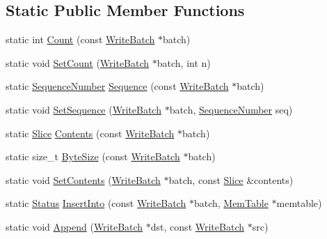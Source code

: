 \subsection*{Static Public Member Functions}
\begin{DoxyCompactItemize}
\item 
static int \mbox{\hyperlink{classleveldb_1_1_write_batch_internal_a5270ca4567dbae1524005ad14e0698e3}{Count}} (const \mbox{\hyperlink{classleveldb_1_1_write_batch}{Write\+Batch}} $\ast$batch)
\item 
static void \mbox{\hyperlink{classleveldb_1_1_write_batch_internal_ae03d20619da53aae175dd28d61c90bd9}{Set\+Count}} (\mbox{\hyperlink{classleveldb_1_1_write_batch}{Write\+Batch}} $\ast$batch, int n)
\item 
static \mbox{\hyperlink{namespaceleveldb_a5481ededd221c36d652c371249f869fa}{Sequence\+Number}} \mbox{\hyperlink{classleveldb_1_1_write_batch_internal_af657c82bd9378b78c35a3a7429f945d4}{Sequence}} (const \mbox{\hyperlink{classleveldb_1_1_write_batch}{Write\+Batch}} $\ast$batch)
\item 
static void \mbox{\hyperlink{classleveldb_1_1_write_batch_internal_a0ca3483de37433fb0ce37b1e91f01bd1}{Set\+Sequence}} (\mbox{\hyperlink{classleveldb_1_1_write_batch}{Write\+Batch}} $\ast$batch, \mbox{\hyperlink{namespaceleveldb_a5481ededd221c36d652c371249f869fa}{Sequence\+Number}} seq)
\item 
static \mbox{\hyperlink{classleveldb_1_1_slice}{Slice}} \mbox{\hyperlink{classleveldb_1_1_write_batch_internal_a348947b16653c8a17590b13115b5274d}{Contents}} (const \mbox{\hyperlink{classleveldb_1_1_write_batch}{Write\+Batch}} $\ast$batch)
\item 
static size\+\_\+t \mbox{\hyperlink{classleveldb_1_1_write_batch_internal_adad424f13cc3e3ed4a2eacb88eaa39df}{Byte\+Size}} (const \mbox{\hyperlink{classleveldb_1_1_write_batch}{Write\+Batch}} $\ast$batch)
\item 
static void \mbox{\hyperlink{classleveldb_1_1_write_batch_internal_aa07e75250aed00d06f2e4df85ee926b9}{Set\+Contents}} (\mbox{\hyperlink{classleveldb_1_1_write_batch}{Write\+Batch}} $\ast$batch, const \mbox{\hyperlink{classleveldb_1_1_slice}{Slice}} \&contents)
\item 
static \mbox{\hyperlink{classleveldb_1_1_status}{Status}} \mbox{\hyperlink{classleveldb_1_1_write_batch_internal_a102aae14259fd277e2576338ce3e5551}{Insert\+Into}} (const \mbox{\hyperlink{classleveldb_1_1_write_batch}{Write\+Batch}} $\ast$batch, \mbox{\hyperlink{classleveldb_1_1_mem_table}{Mem\+Table}} $\ast$memtable)
\item 
static void \mbox{\hyperlink{classleveldb_1_1_write_batch_internal_ac83c9a45a815c16ad8602b99b752b4bc}{Append}} (\mbox{\hyperlink{classleveldb_1_1_write_batch}{Write\+Batch}} $\ast$dst, const \mbox{\hyperlink{classleveldb_1_1_write_batch}{Write\+Batch}} $\ast$src)
\end{DoxyCompactItemize}


